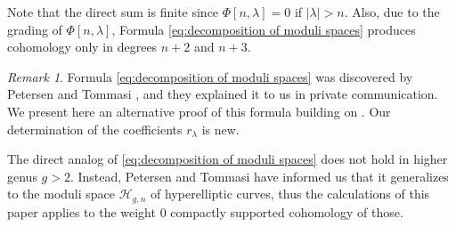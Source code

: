 \documentclass[12pt]{article}
\newcommand{\N}{\mathbb{N}}
\newcommand{\Specht}[1]{\chi_{#1}}
\newcommand{\ModuliCurve}[1]{\mathcal{M}_{#1}}
\DeclareMathOperator{\gr}{gr}
\theoremstyle{plain}
\newtheorem{cor}[thm]{Corollary}
\theoremstyle{definition}
\theoremstyle{remark}
\newtheorem{rmk}[thm]{Remark}
\begin{document}
Note that the direct sum is finite since $\Phi[n,\lambda] = 0$ if $|\lambda| > n$. Also, due to the grading of $\Phi[n,\lambda]$, Formula \eqref{eq:decomposition of moduli spaces} produces cohomology only in degrees $n+2$ and $n+3$.

\begin{rmk}
    Formula \eqref{eq:decomposition of moduli spaces} was discovered by Petersen and Tommasi \cite{petersen-tommasi}, and they explained it to us in private communication. We present here an alternative proof of this formula building on \cite[Theorem 1.2]{BCGY21}.
    Our determination of the coefficients $r_\lambda$ is new.
    
    The direct analog of \eqref{eq:decomposition of moduli spaces} does not hold in higher genus $g>2$. Instead, Petersen and Tommasi have informed us that it generalizes to the moduli space $\mathcal{H}_{g,n}$ of hyperelliptic curves, thus the calculations of this paper applies to the weight $0$ compactly supported cohomology of those.
\end{rmk}

%
\end{document}
